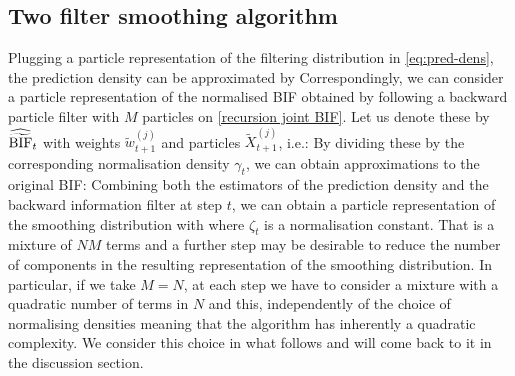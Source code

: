 \subsection{\label{introTFS}Two filter smoothing algorithm}
Plugging a particle representation of the filtering distribution in \eqref{eq:pred-dens}, the prediction density can be approximated by
%
%
Correspondingly, we can consider a particle representation of the normalised BIF obtained by following a backward particle filter with $M$ particles on \eqref{recursion joint BIF}. 
Let us denote these by $\widehat{\widetilde{\text{BIF}}}_{t}$ with weights $\tilde w_{t+1}^{(j)}$ and particles $\tilde X^{(j)}_{t+1}$, i.e.:
%
%
By dividing these by the corresponding normalisation density $\gamma_{t}$, we can obtain approximations to the original BIF:
%
%
Combining both the estimators of the prediction density and the backward information filter at step $t$, we can obtain a particle representation of the smoothing distribution with
%
%
where $\zeta_{t}$ is a normalisation constant.
That is a mixture of $NM$ terms and a further step may be desirable to reduce the number of components in the resulting representation of the smoothing distribution.
In particular, if we take $M=N$, at each step we have to consider a mixture with a quadratic number of terms in $N$ and this, independently of the choice of normalising densities meaning that the algorithm has inherently a quadratic complexity. We consider this choice in what follows and will come back to it in the discussion section.

